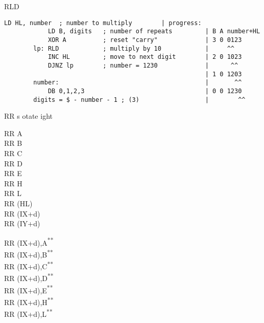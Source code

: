 \documentclass[12pt,twoside,openright,a4paper]{book}
\newcommand{\UNDOC}{\textnormal{\textsuperscript{**}}}
\begin{document}
\begin{basedescript}{
	\desclabelstyle{\multilinelabel}
	\desclabelwidth{3cm}}
\begin{DetailItem}{RLD}
		\begin{Verbatim}[gobble=2]
			LD HL, number  ; number to multiply        | progress:
			LD B, digits   ; number of repeats         | B A number+HL
			XOR A          ; reset "carry"             | 3 0 0123
		lp: RLD            ; multiply by 10            |     ^^ 
			INC HL         ; move to next digit        | 2 0 1023
			DJNZ lp        ; number = 1230             |      ^^
			                                           | 1 0 1203
		number:                                        |       ^^
			DB 0,1,2,3                                 | 0 0 1230
		digits = $ - number - 1 ; (3)                  |        ^^
		\end{Verbatim}

		\begin{DetailEffects}[p]
			\FlagsRLD
		\end{DetailEffects}
						
		\begin{DetailTiming}
		\end{DetailTiming}


	\end{DetailItem}

	\pagebreak
	\begin{DetailItem}{RR s}
		{otate ight}
		{}

		\begin{DetailVariants}
			RR A\\
			RR B\\
			RR C\\
			RR D\\
			RR E\\
			RR H\\
			RR L\\
			RR (HL)\\
			RR (IX+d)\\
			RR (IY+d)

			\columnbreak
			RR (IX+d),A\UNDOC\\
			RR (IX+d),B\UNDOC\\
			RR (IX+d),C\UNDOC\\
			RR (IX+d),D\UNDOC\\
			RR (IX+d),E\UNDOC\\
			RR (IX+d),H\UNDOC\\
			RR (IX+d),L\UNDOC


\end{DetailVariants}
\end{DetailItem}
\end{basedescript}
\end{document}
